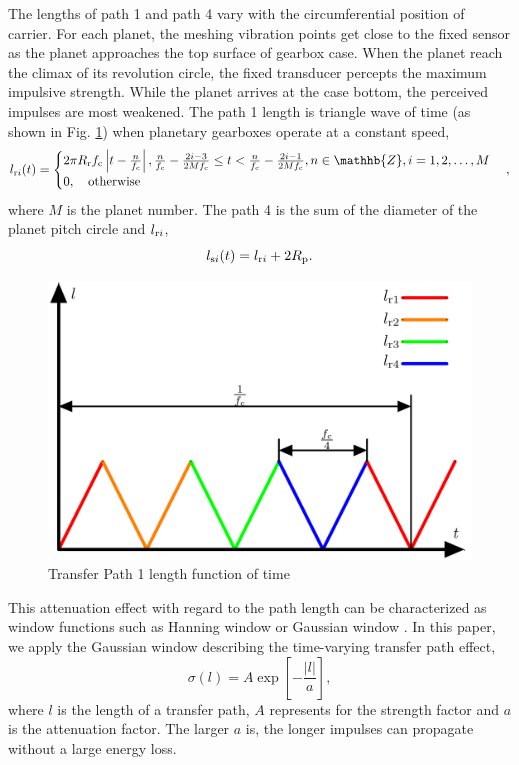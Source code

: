 \documentclass[a4paper]{cas-sc}%
\begin{document}
\par The lengths of path 1 and path 4 vary with the circumferential position of carrier. For each planet, the meshing vibration points get close to the fixed sensor as the planet approaches the top surface of gearbox case. When the planet reach the climax of its revolution circle, the fixed transducer percepts the maximum impulsive strength. While the planet arrives at the case bottom, the perceived impulses are most weakened. The path 1 length is triangle wave of time (as shown in Fig. \ref{fig:path_length_trangle_wave}) when planetary gearboxes operate at a constant speed, 
\begin{equation}
    l_{{\rm r}i}(t)=
    \begin{cases}
        2 \pi R_{\rm r} f_{\rm c} \left|t-\frac{n}{f_{\rm c}}\right|, \frac{n}{f_{\rm c}} - \frac{2i-3}{2 M f_{\rm c}} \leq t < \frac{n}{f_{\rm c}} - \frac{2i-1}{2 M f_{\rm c}}, n\in \mathhb{Z}, i=1,2,\ldots,M\\
        0, \quad \text{otherwise}
    \end{cases},
\end{equation}
where $M$ is the planet number. The path 4 is the sum of the diameter of the planet pitch circle and $l_{{\rm r}i}$,
\begin{equation}
    l_{{\rm s}i}(t)=l_{{\rm r}i}+2 R_{\rm p}.
\end{equation}
\begin{figure}[pos=htbp]
    \centering
    \includegraphics[scale=0.5]{trangle_wave.png}
    \caption{Transfer Path 1 length function of time}
    \label{fig:path_length_trangle_wave}
\end{figure}
\par This attenuation effect with regard to the path length can be characterized as window functions such as Hanning window or Gaussian window \cite{Mark2009}. In this paper, we apply the Gaussian window describing the time-varying transfer path effect,
\begin{equation}
    \sigma(l)=A\exp\left[-\frac{\left|l\right|}{a}\right],\label{eq:general_transfer_path}
\end{equation}
where $l$ is the length of a transfer path, $A$ represents for the strength factor and $a$ is the attenuation factor. The larger $a$ is, the longer impulses can propagate without a large energy loss.
\end{document}
